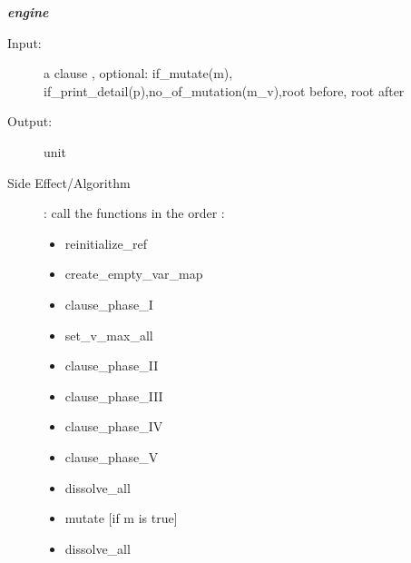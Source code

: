 \documentclass[12pt]{article}
\begin{document}
\begin{description}
\item \textbf{\textit{engine}}
\begin{description}
    \item[Input:] a clause , {optional: if\_mutate(m), if\_print\_detail(p),no\_of\_mutation(m\_v),root before, root after}
    \item[Output:] unit
    \item[Side Effect/Algorithm]: call the functions in the order :
    \begin{itemize}
        \item reinitialize\_ref
        \item create\_empty\_var\_map
        \item clause\_phase\_I
        \item set\_v\_max\_all
        \item clause\_phase\_II
        \item clause\_phase\_III
        \item clause\_phase\_IV
        \item clause\_phase\_V
        \item dissolve\_all
        \item mutate [if m is true]
        \item dissolve\_all
    \end{itemize}
\end{description}

\end{description}
\end{document}
